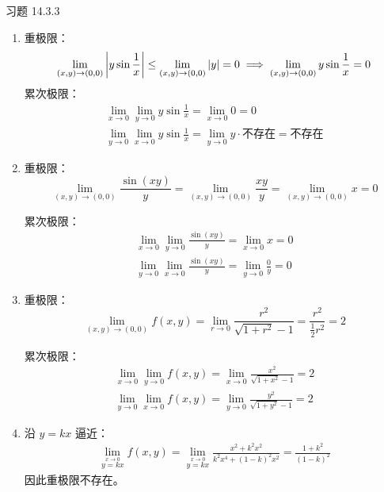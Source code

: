 \begin{problem}
    习题 14.3.3
    \begin{solution}
        \begin{enumerate}
            \item[\textbf{1)}] 重极限：
            $$
            \lim_{(x, y) \to (0, 0)} \abs{y \sin \frac{1}{x}} \le \lim_{(x, y) \to (0, 0)} \abs{y} = 0 \implies \lim_{(x, y) \to (0, 0)} y \sin \frac{1}{x} = 0
            $$
            累次极限：
            $$
            \begin{gathered}
                \lim_{x \to 0} \lim_{y \to 0} y \sin \frac{1}{x} = \lim_{x \to 0} 0 = 0 \\
                \lim_{y \to 0} \lim_{x \to 0} y \sin \frac{1}{x} = \lim_{y \to 0} y \cdot \text{不存在} = \text{不存在}
            \end{gathered}
            $$

            \item[\textbf{3)}] 重极限：
            $$
            \lim_{(x, y) \to (0, 0)} \frac{\sin (xy)}{y} = \lim_{(x, y) \to (0, 0)} \frac{x y}{y} = \lim_{(x, y) \to (0, 0)} x = 0
            $$
            
            累次极限：
            $$
            \begin{gathered}
                \lim_{x \to 0} \lim_{y \to 0} \frac{\sin (x y)}{y} = \lim_{x \to 0} x = 0 \\
                \lim_{y \to 0} \lim_{x \to 0} \frac{\sin (x y)}{y} = \lim_{y \to 0} \frac{0}{y} = 0
            \end{gathered}
            $$

            \item[\textbf{5)}] 重极限：
            $$
            \lim_{(x, y) \to (0, 0)} f(x, y) = \lim_{r \to 0} \frac{r^2}{\sqrt{1 + r^2} - 1} = \frac{r^2}{\frac{1}{2} r^2} = 2
            $$
            
            累次极限：
            $$
            \begin{gathered}
                \lim_{x \to 0} \lim_{y \to 0} f(x, y) = \lim_{x \to 0} \frac{x^2}{\sqrt{1 + x^2} - 1} = 2 \\
                \lim_{y \to 0} \lim_{x \to 0} f(x, y) = \lim_{y \to 0} \frac{y^2}{\sqrt{1 + y^2} - 1} = 2
            \end{gathered}
            $$

            \item[\textbf{7)}] 沿 $y = kx$ 逼近：
            $$
            \begin{gathered}
                \lim_{\stackrel{x \to 0}{y = kx}} f(x, y) = \lim_{\stackrel{x \to 0}{y = kx}} \frac{x^2 + k^2 x^2}{k^2 x^4 + (1 - k)^2 x^2} = \frac{1 + k^2}{(1 - k)^2}
            \end{gathered}
            $$
            因此重极限不存在。


\end{enumerate}
\end{solution}
\end{problem}
